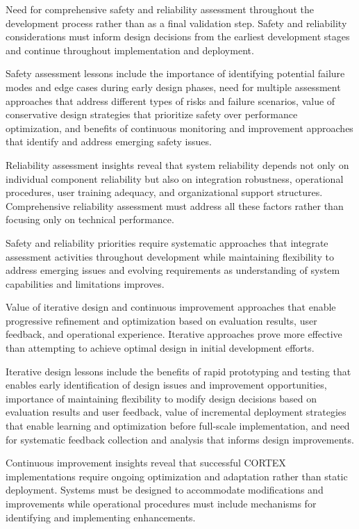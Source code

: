 Need for comprehensive safety and reliability assessment throughout the development process rather than as a final validation step. Safety and reliability considerations must inform design decisions from the earliest development stages and continue throughout implementation and deployment.

Safety assessment lessons include the importance of identifying potential failure modes and edge cases during early design phases, need for multiple assessment approaches that address different types of risks and failure scenarios, value of conservative design strategies that prioritize safety over performance optimization, and benefits of continuous monitoring and improvement approaches that identify and address emerging safety issues.

Reliability assessment insights reveal that system reliability depends not only on individual component reliability but also on integration robustness, operational procedures, user training adequacy, and organizational support structures. Comprehensive reliability assessment must address all these factors rather than focusing only on technical performance.

Safety and reliability priorities require systematic approaches that integrate assessment activities throughout development while maintaining flexibility to address emerging issues and evolving requirements as understanding of system capabilities and limitations improves.

Value of iterative design and continuous improvement approaches that enable progressive refinement and optimization based on evaluation results, user feedback, and operational experience. Iterative approaches prove more effective than attempting to achieve optimal design in initial development efforts.

Iterative design lessons include the benefits of rapid prototyping and testing that enables early identification of design issues and improvement opportunities, importance of maintaining flexibility to modify design decisions based on evaluation results and user feedback, value of incremental deployment strategies that enable learning and optimization before full-scale implementation, and need for systematic feedback collection and analysis that informs design improvements.

Continuous improvement insights reveal that successful CORTEX implementations require ongoing optimization and adaptation rather than static deployment. Systems must be designed to accommodate modifications and improvements while operational procedures must include mechanisms for identifying and implementing enhancements.

